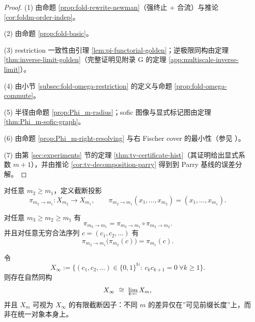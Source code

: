 \begin{proof}
(1) 由命题 \ref{prop:fold-rewrite-newman}（强终止 + 合流）与推论 \ref{cor:foldm-order-indep}。

(2) 由命题 \ref{prop:fold-basic}。

(3) restriction 一致性由引理 \ref{lem:pi-functorial-golden}；逆极限同构由定理 \ref{thm:inverse-limit-golden}（完整证明见附录 G 的定理 \ref{app:multiscale-inverse-limit}）。

(4) 由小节 \ref{subsec:fold-omega-restriction} 的定义与命题 \ref{prop:fold-omega-commute}。

(5) 半径由命题 \ref{prop:Phi_m-radius}；sofic 图像与显式标记图由定理 \ref{thm:Phi_m-sofic-graph}。

(6) 由命题 \ref{prop:Phi_m-right-resolving} 与右 Fischer cover 的最小性（参见 \cite{LindMarcus1995,Kitchens1998SymbolicDynamics}）。

(7) 由第 \ref{sec:experiments} 节的定理 \ref{thm:tv-certificate-hist}（其证明给出显式系数 $m+1$），并由推论 \ref{cor:tv-decomposition-parry} 得到到 Parry 基线的误差分解。
\end{proof}

\begin{definition}\label{def:pi-m2-m1-golden}
对任意 $m_2\ge m_1$，定义截断投影
\[
\pi_{m_2\to m_1}:X_{m_2}\to X_{m_1},\qquad
\pi_{m_2\to m_1}(x_1,\dots,x_{m_2})=(x_1,\dots,x_{m_1}).
\]
\end{definition}

\begin{lemma}[一致性]\label{lem:pi-functorial-golden}
对任意 $m_3\ge m_2\ge m_1$ 有
\[
\pi_{m_3\to m_1}=\pi_{m_2\to m_1}\circ \pi_{m_3\to m_2}.
\]
并且对任意无穷合法序列 $c=(c_1,c_2,\dots)$ 有
\[
\pi_{m_2\to m_1}\bigl(\pi_{m_2}(c)\bigr)=\pi_{m_1}(c).
\]
\end{lemma}


\begin{theorem}\label{thm:inverse-limit-golden}
令
\[
X_\infty:=\{(c_1,c_2,\dots)\in\{0,1\}^{\mathbb{N}}:\ c_kc_{k+1}=0\ \forall k\ge 1\}.
\]
则存在自然同构
\[
X_\infty\ \cong\ \varprojlim X_m,
\]
并且 $X_m$ 可视为 $X_\infty$ 的有限截断因子：不同 $m$ 的差异仅在”可见前缀长度”上，而非在统一对象本身上。
\end{theorem}

